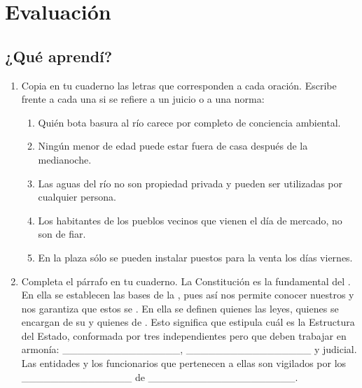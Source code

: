 \documentclass[10pt,twoside]{article}
\begin{document}
\section*{Evaluaci\'{o}n}
\subsection*{¿Qu\'{e} aprend\'{i}?}
\begin{enumerate}
\item Copia en tu cuaderno las letras que corresponden a cada
oración. Escribe frente a cada una si se refiere a un juicio o a una norma:
\begin{enumerate}
\item Quién bota basura al río carece por completo de conciencia ambiental.
\item Ningún menor de edad puede estar fuera de casa después
de la medianoche.
\item Las aguas del río no son propiedad privada y pueden ser
utilizadas por cualquier persona.
\item Los habitantes de los pueblos vecinos que vienen el día de mercado, no son de fiar.
\item En la plaza sólo se pueden instalar puestos para la venta los días viernes.
\end{enumerate}
\item Completa el párrafo en tu cuaderno.
La Constitución es la \underline{\hspace*{1cm}} fundamental del \underline{\hspace*{1.5cm}}. En ella se establecen las bases de la \underline{\hspace*{1.5cm}}, pues así nos permite conocer nuestros \underline{\hspace*{1.5cm}} y nos garantiza que estos se \underline{\hspace*{1.5cm}}. En ella se definen quienes \underline{\hspace*{1.5cm}} las leyes, quienes se encargan de su \underline{\hspace*{2cm}} y quienes de \underline{\hspace*{2cm}}. Esto significa que estipula cuál es la Estructura del Estado, conformada por tres \underline{\hspace*{1.5cm}} independientes pero que deben trabajar en armonía: ________________, _________________
y judicial. Las entidades y los funcionarios que pertenecen a ellas
son vigilados por los _______________ de ____________________.


\end{enumerate}
\end{document}
